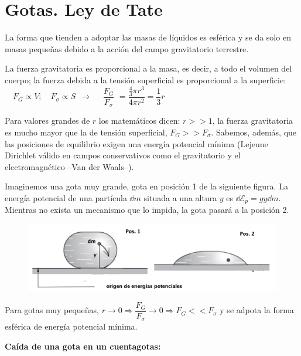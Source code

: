 \section{Gotas. Ley de Tate}

La forma que tienden a adoptar las masas de líquidos es esférica y se da solo en masas pequeñas debido a la acción del campo gravitatorio terrestre.

La fuerza gravitatoria es proporcional a la masa, es decir, a todo el volumen del cuerpo; la fuerza debida a la tensión superficial es proporcional a la superficie: $\quad F_G \propto V;\quad F_{\sigma} \propto S \ \ \to \quad$
$\dfrac{F_G} {F_{\sigma}}$
$=\dfrac{\frac 4 3 \pi r^3}{4 \pi r^2}=\dfrac 1 3 r$

Para valores grandes de $r$ \textcolor{gris}{los matemáticos dicen: $r>>1$}, la fuerza gravitatoria es mucho mayor que la de tensión superficial, $F_G>>F_\sigma$.  Sabemos, además, que las posiciones de equilibrio exigen una energía potencial mínima (Lejeune Dirichlet \textcolor{gris}{ válido en campos conservativos como el gravitatorio y el electromagnético --Van der Waals--}).

Imaginemos una gota muy grande, gota en posición 1 de la siguiente figura. La energía potencial de una partícula $\dd m$ situada a una altura $y$ es $\dd \mathcal E_p=gy\dd m$. Mientras no exista un mecanismo que lo impida, la gota pasará a la posición 2.

\begin{figure}[H]
	\centering
	\includegraphics[width=1\textwidth]{imagenes/imagenes08/T08IM09.png}
\end{figure}


Para gotas muy pequeñas, $r \to 0 \Rightarrow \dfrac {F_G}{F_\sigma} \to 0 \Rightarrow F_G<<F_\sigma$ y se adpota la forma esférica de energía potencial mínima.

\textbf{Caída de una gota en un cuentagotas:}


